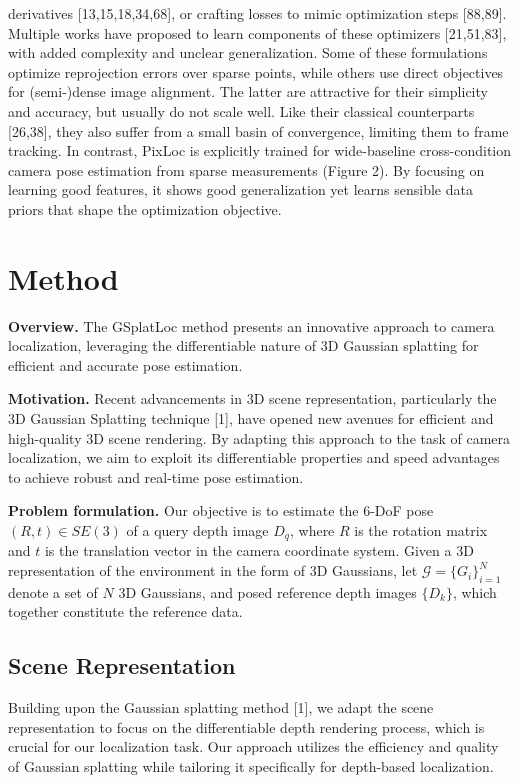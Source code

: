 \documentclass[twocolumn]{article} %
\begin{document}
derivatives {[}13,15,18,34,68{]}, or crafting losses to mimic
optimization steps {[}88,89{]}. Multiple works have proposed to learn
components of these optimizers {[}21,51,83{]}, with added complexity and
unclear generalization. Some of these formulations optimize reprojection
errors over sparse points, while others use direct objectives for
(semi-)dense image alignment. The latter are attractive for their
simplicity and accuracy, but usually do not scale well. Like their
classical counterparts {[}26,38{]}, they also suffer from a small basin
of convergence, limiting them to frame tracking. In contrast, PixLoc is
explicitly trained for wide-baseline cross-condition camera pose
estimation from sparse measurements (Figure 2). By focusing on learning
good features, it shows good generalization yet learns sensible data
priors that shape the optimization objective.

\section{Method}\label{method}

\textbf{Overview.} The GSplatLoc method presents an innovative approach
to camera localization, leveraging the differentiable nature of 3D
Gaussian splatting for efficient and accurate pose estimation.

\textbf{Motivation.} Recent advancements in 3D scene representation,
particularly the 3D Gaussian Splatting technique {[}1{]}, have opened
new avenues for efficient and high-quality 3D scene rendering. By
adapting this approach to the task of camera localization, we aim to
exploit its differentiable properties and speed advantages to achieve
robust and real-time pose estimation.

\textbf{Problem formulation.} Our objective is to estimate the 6-DoF
pose \((R, t) \in SE(3)\) of a query depth image \(D_q\), where \(R\) is
the rotation matrix and \(t\) is the translation vector in the camera
coordinate system. Given a 3D representation of the environment in the
form of 3D Gaussians, let \(\mathcal{G} = \{G_i\}_{i=1}^N\) denote a set
of \(N\) 3D Gaussians, and posed reference depth images \(\{D_k\}\),
which together constitute the reference data.

\subsection{Scene Representation}\label{scene-representation}

Building upon the Gaussian splatting method {[}1{]}, we adapt the scene
representation to focus on the differentiable depth rendering process,
which is crucial for our localization task. Our approach utilizes the
efficiency and quality of Gaussian splatting while tailoring it
specifically for depth-based localization.
\end{document}
